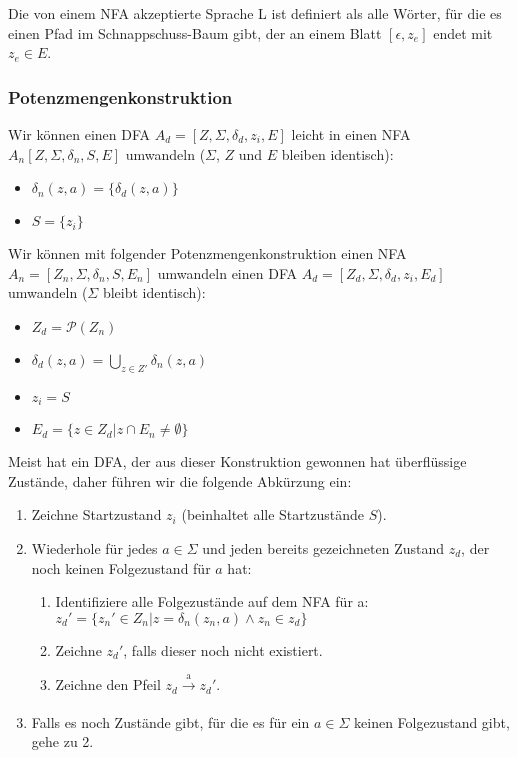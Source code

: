 Die von einem NFA akzeptierte Sprache L ist definiert als alle Wörter,
für die es einen Pfad im Schnappschuss-Baum gibt,
der an einem Blatt $[\epsilon, z_e]$ endet mit $z_e \in E$.

\subsubsection{Potenzmengenkonstruktion}
Wir können einen DFA $A_d = [Z, \Sigma, \delta_d, z_i, E]$
leicht in einen NFA $A_n [Z, \Sigma, \delta_n, S, E]$ umwandeln
($\Sigma$, $Z$ und $E$ bleiben identisch):
\begin{itemize}
    \item $\delta_n(z, a) = \{\delta_d(z, a)\}$
    \item $S = \{z_i\}$
\end{itemize}

Wir können mit folgender Potenzmengenkonstruktion
einen NFA $A_n =  [Z_n, \Sigma, \delta_n, S, E_n]$ umwandeln
einen DFA $A_d = [Z_d, \Sigma, \delta_d, z_i, E_d]$
umwandeln
($\Sigma$ bleibt identisch):
\begin{itemize}
    \item $Z_d = \mathcal{P}(Z_n)$
    \item $\delta_d(z, a) = \bigcup\limits_{z \in Z'} \delta_n(z, a)$
    \item $z_i = S$
    \item $E_d = \{z \in Z_d| z \cap E_n \neq \emptyset \}$
\end{itemize}

Meist hat ein DFA,
der aus dieser Konstruktion gewonnen hat überflüssige Zustände,
daher führen wir die folgende Abkürzung ein:
\begin{enumerate}
    \item Zeichne Startzustand $z_i$ (beinhaltet alle Startzustände $S$).
    \item Wiederhole für jedes $a \in \Sigma$ und jeden bereits gezeichneten Zustand $z_d$,
        der noch keinen Folgezustand für $a$ hat:
        \begin{enumerate}
            \item Identifiziere alle Folgezustände auf dem NFA für a:\\
                $z_d' = \{z_n' \in Z_n| z = \delta_n(z_n,a) \wedge z_n \in z_d\}$\\
            \item Zeichne $z_d'$, falls dieser noch nicht existiert.
            \item Zeichne den Pfeil $z_d \xrightarrow[]{\text{a}} z_d'$.
        \end{enumerate}
    \item Falls es noch Zustände gibt, für die es für ein $a \in \Sigma$ keinen Folgezustand gibt,
        gehe zu 2.
\end{enumerate}


